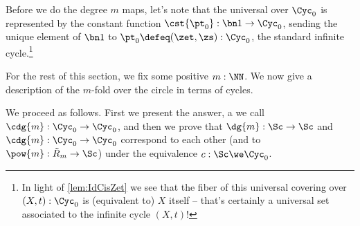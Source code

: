 Before we do the degree $m$ maps, let's note that the
universal \covering over $\Cyc_0$ is represented by the constant function
$\cst{\pt_0}:\bn 1\to\Cyc_0$, sending the unique element
of $\bn 1$ to $\pt_0\defeq(\zet,\zs):\Cyc_0$, the standard infinite cycle.\footnote{%
  In light of \cref{lem:IdCisZet} we see that the fiber
  of this universal covering over $(X,t):\Cyc_0$ is (equivalent to) $X$ itself
  -- that's certainly a universal set associated to the
  infinite cycle $(X,t)$!}

For the rest of this section, we fix some positive $m:\NN$.
We now give a description of
the $m$-fold \covering over the circle in terms of cycles.

We proceed as follows.
First we present the answer, a \covering we call $\cdg{m}:\Cyc_0\to\Cyc_0$,
and then we prove that $\dg{m}:\Sc\to\Sc$ and $\cdg{m}:\Cyc_0\to\Cyc_0$
correspond to each other (and to $\pow{m}:\tilde R_m\to\Sc$)
under the equivalence $c:\Sc\we\Cyc_0$.


